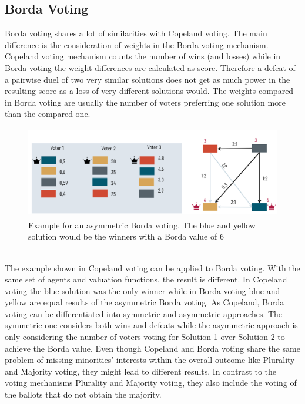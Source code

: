 \documentclass[german, a4paper, 11pt, oneside]{scrbook}
\begin{document}
\subsection{Borda Voting}
Borda voting shares a lot of similarities with Copeland voting. The main difference is the consideration of weights in the Borda voting mechanism. Copeland voting mechanism counts the number of wins (and losses) while in Borda voting the weight differences are calculated as score. \cite{Brandt} Therefore a defeat of a pairwise duel of two very similar solutions does not get as much power in the resulting score as a loss of very different solutions would. The weights compared in Borda voting are usually the number of voters preferring one solution more than the compared one. 
\begin{figure}[h]
\centering
\includegraphics[height=4cm]{Borda_asym}
\caption{Example for an asymmetric Borda voting. The blue and yellow solution would be the winners with a Borda value of 6}
\end{figure}
\\The example shown in Copeland voting can be applied to Borda voting. With the same set of agents and valuation functions, the result is different. In Copeland voting the blue solution was the only winner while in Borda voting blue and yellow are equal results of the asymmetric Borda voting. As Copeland, Borda voting can be differentiated into symmetric and asymmetric approaches. The symmetric one considers both wins and defeats while the asymmetric approach is only considering the number of voters voting for Solution 1 over Solution 2 to achieve the Borda value. \cite{Brandt} Even though Copeland and Borda voting share the same problem of missing minorities' interests within the overall outcome like Plurality and Majority voting, they might lead to different results. In contrast to the voting mechanisms Plurality and Majority voting, they also include the voting of the ballots that do not obtain the majority. 
\end{document}
